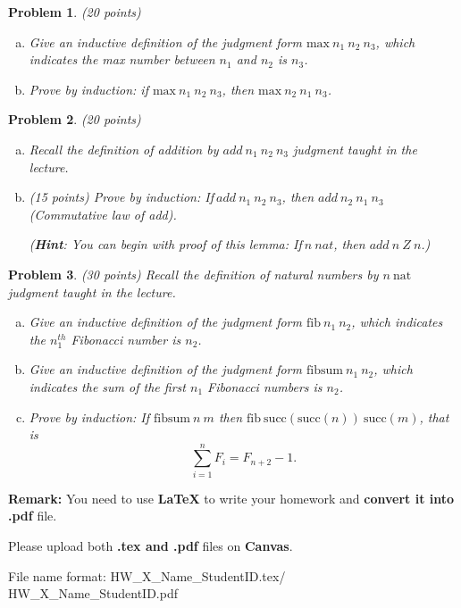 \documentclass[12pt]{article}
\newtheorem{hw}{Problem}
\newenvironment{sol}
  {\par\vspace{3mm}\noindent{\it Solution}.}
  {\qed}
\begin{document}
\begin{hw}\rm (20 points)
	\begin{enumerate}[(a)]
		\item Give an inductive definition of the judgment form
		$\mbox{max}\ n_1\ n_2\ n_3$, which indicates the max number between $n_1$ and $n_2$ is $n_3$.
		\item Prove by induction:
		if $\mbox{max}\ n_1\ n_2\ n_3$, then  $\mbox{max}\ n_2\ n_1\ n_3$.
	\end{enumerate}
\end{hw}

\begin{hw}\rm (20 points)
	\begin{enumerate}[(a)]
		\item Recall the definition of addition by $add\ n_{1}\ n_{2}\ n_{3}$ judgment taught in the lecture.
		\item (15 points) Prove by induction: If$\ add\ n_{1}\ n_{2}\ n_{3}$, then $add\ n_{2}\ n_{1}\ n_{3}$ (Commutative law of add).
		
		(\textbf{Hint}: You can begin with proof of this lemma: If$\ n\ nat$, then $add\ n\ Z\ n$.)
	\end{enumerate}
\end{hw}

\begin{hw}\rm (30 points)
	Recall the definition of natural numbers by $n\ \mbox{nat}$ judgment taught in the lecture.
	\begin{enumerate}[(a)]
		\item Give an inductive definition of the judgment form
		$\mbox{fib}\ n_1\ n_2$, which indicates the $n_1^{th}$ Fibonacci number is $n_2$.
		\item Give an inductive definition of the judgment form
		$\mbox{fibsum}\ n_1\ n_2$, which indicates the sum of the first $n_1$ Fibonacci
		numbers is $n_2$.
		\item Prove by induction:
		If $\mbox{fibsum}\ n\ m$ then $\mbox{fib}\
		\mbox{succ}(\mbox{succ}(n))\ \mbox{succ}(m)$, that is
		$$\sum_{i=1}^n F_i = F_{n+2} - 1.$$
	\end{enumerate}
\end{hw}


\vspace{20pt}

\textbf{Remark:} 
You need to use \textbf{LaTeX} to write your homework and \textbf{convert it into .pdf} file.

Please upload both \textbf{.tex and .pdf} files on \textbf{Canvas}.

File name format: {\color{red} HW\_X\_Name\_StudentID.tex/\color{red} HW\_X\_Name\_StudentID.pdf}
\end{document}
